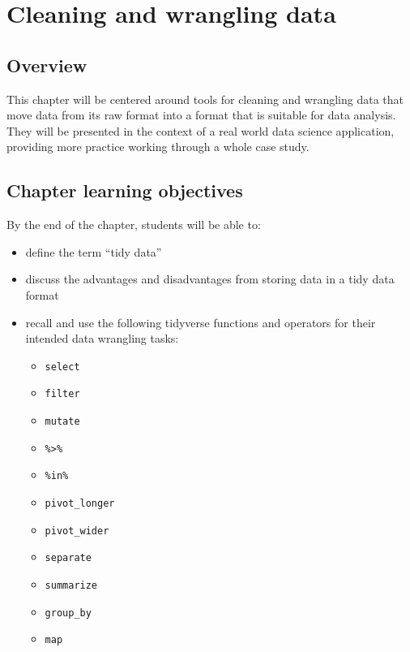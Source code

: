 \documentclass[
]{krantz}
\providecommand{\tightlist}{%
  \setlength{\itemsep}{0pt}\setlength{\parskip}{0pt}}
\begin{document}
\hypertarget{wrangling}{%
\chapter{Cleaning and wrangling data}\label{wrangling}}

\hypertarget{overview-1}{%
\section{Overview}\label{overview-1}}

This chapter will be centered around tools for cleaning and wrangling data that move data from its raw format into a format that is suitable for data analysis. They
will be presented in the context of a real world data science application, providing more practice working through a whole case study.

\hypertarget{chapter-learning-objectives-2}{%
\section{Chapter learning objectives}\label{chapter-learning-objectives-2}}

By the end of the chapter, students will be able to:

\begin{itemize}
\tightlist
\item
  define the term ``tidy data''
\item
  discuss the advantages and disadvantages from storing data in a tidy data format
\item
  recall and use the following tidyverse functions and operators for their intended data wrangling tasks:

  \begin{itemize}
  \tightlist
  \item
    \texttt{select}
  \item
    \texttt{filter}
  \item
    \texttt{mutate}
  \item
    \texttt{\%\textgreater{}\%}
  \item
    \texttt{\%in\%}
  \item
    \texttt{pivot\_longer}
  \item
    \texttt{pivot\_wider}
  \item
    \texttt{separate}
  \item
    \texttt{summarize}
  \item
    \texttt{group\_by}
  \item
    \texttt{map}
  \end{itemize}
\end{itemize}
\end{document}
